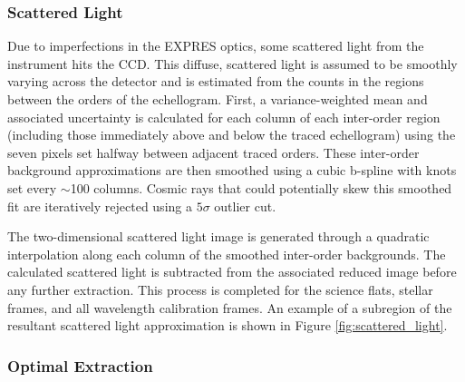 \subsubsection{Scattered Light}\label{scattered-light}

Due to imperfections in the EXPRES optics, some scattered light from the instrument hits the CCD. This diffuse, scattered light is assumed to be smoothly varying across the detector and is estimated from the counts in the regions between the orders of the echellogram. First, a variance-weighted mean and associated uncertainty is calculated for each column of each inter-order region (including those immediately above and below the traced echellogram) using the seven pixels set halfway between adjacent traced orders. These inter-order background approximations are then smoothed using a cubic b-spline with knots set every $\sim$100 columns. Cosmic rays that could potentially skew this smoothed fit are iteratively rejected using a $5\sigma$ outlier cut.

The two-dimensional scattered light image is generated through a quadratic interpolation along each column of the smoothed inter-order backgrounds. The calculated scattered light is subtracted from the associated reduced image before any further extraction. This process is completed for the science flats, stellar frames, and all wavelength calibration frames. An example of a subregion of the resultant scattered light approximation is shown in Figure \ref{fig:scattered_light}.

\subsubsection{Optimal Extraction}\label{optimal-extraction}

